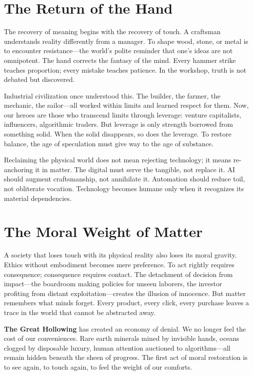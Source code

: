\documentclass[11pt,twoside]{book}
\begin{document}
\section*{The Return of the Hand}

The recovery of meaning begins with the recovery of touch.  
A craftsman understands reality differently from a manager.  
To shape wood, stone, or metal is to encounter resistance—the world’s polite reminder that one’s ideas are not omnipotent.  
The hand corrects the fantasy of the mind.  
Every hammer strike teaches proportion; every mistake teaches patience.  
In the workshop, truth is not debated but discovered.

Industrial civilization once understood this.  
The builder, the farmer, the mechanic, the sailor—all worked within limits and learned respect for them.  
Now, our heroes are those who transcend limits through leverage: venture capitalists, influencers, algorithmic traders.  
But leverage is only strength borrowed from something solid.  
When the solid disappears, so does the leverage.  
To restore balance, the age of speculation must give way to the age of substance.

Reclaiming the physical world does not mean rejecting technology; it means re-anchoring it in matter.  
The digital must serve the tangible, not replace it.  
AI should augment craftsmanship, not annihilate it.  
Automation should reduce toil, not obliterate vocation.  
Technology becomes humane only when it recognizes its material dependencies.

\section*{The Moral Weight of Matter}

A society that loses touch with its physical reality also loses its moral gravity.  
Ethics without embodiment becomes mere preference.  
To act rightly requires consequence; consequence requires contact.  
The detachment of decision from impact—the boardroom making policies for unseen laborers, the investor profiting from distant exploitation—creates the illusion of innocence.  
But matter remembers what minds forget.  
Every product, every click, every purchase leaves a trace in the world that cannot be abstracted away.

\textbf{The Great Hollowing} has created an economy of denial.  
We no longer feel the cost of our conveniences.  
Rare earth minerals mined by invisible hands, oceans clogged by disposable luxury, human attention auctioned to algorithms—all remain hidden beneath the sheen of progress.  
The first act of moral restoration is to see again, to touch again, to feel the weight of our comforts.
\end{document}
